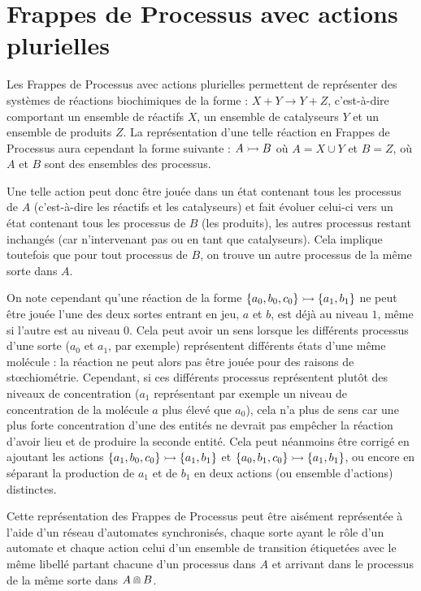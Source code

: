 \section{Frappes de Processus avec actions plurielles}


Les Frappes de Processus avec actions plurielles permettent de représenter des systèmes
de réactions biochimiques de la forme : $X + Y \rightarrow Y + Z$,
c'est-à-dire comportant un ensemble de réactifs $X$, un ensemble de catalyseurs $Y$
et un ensemble de produits $Z$.
La représentation d'une telle réaction en Frappes de Processus aura cependant la forme suivante :
$\mbox{$A \rightarrowtail B$}$ où $A = X \cup Y$ et $B = Z$,
où $A$ et $B$ sont des ensembles des processus.

Une telle action peut donc être jouée dans un état contenant tous les processus de $A$
(c'est-à-dire les réactifs et les catalyseurs)
et fait évoluer celui-ci vers un état contenant tous les processus de $B$ (les produits),
les autres processus restant inchangés (car n'intervenant pas ou en tant que catalyseurs).
Cela implique toutefois que pour tout processus de $B$, on trouve un autre processus de la même
sorte dans $A$.

On note cependant qu'une réaction de la forme $\mbox{$\{ a_0, b_0, c_0 \} \rightarrowtail \{ a_1, b_1 \}$}$
ne peut être jouée l'une des deux sortes entrant en jeu, $a$ et $b$, est déjà au niveau $1$,
même si l'autre est au niveau $0$.
Cela peut avoir un sens lorsque les différents processus d'une sorte ($a_0$ et $a_1$, par exemple)
représentent différents états d'une même molécule :
la réaction ne peut alors pas être jouée pour des raisons de stœchiométrie.
Cependant, si ces différents processus représentent plutôt des niveaux de concentration
($a_1$ représentant par exemple un niveau de concentration de la molécule $a$ plus élevé que $a_0$),
cela n'a plus de sens car une plus forte concentration d'une des entités ne devrait pas empêcher
la réaction d'avoir lieu et de produire la seconde entité.
Cela peut néanmoins être corrigé en ajoutant les actions
$\mbox{$\{ a_1, b_0, c_0 \} \rightarrowtail \{ a_1, b_1 \}$}$ et
$\mbox{$\{ a_0, b_1, c_0 \} \rightarrowtail \{ a_1, b_1 \}$}$,
ou encore en séparant la production de $a_1$ et de $b_1$ en deux actions (ou ensemble d'actions)
distinctes.

Cette représentation des Frappes de Processus peut être aisément représentée à l'aide d'un réseau
d'automates synchronisés, chaque sorte ayant le rôle d'un automate et chaque action celui d'un
ensemble de transition étiquetées avec le même libellé partant chacune d'un processus dans $A$ et
arrivant dans le processus de la même sorte dans $A \Cap B$.

